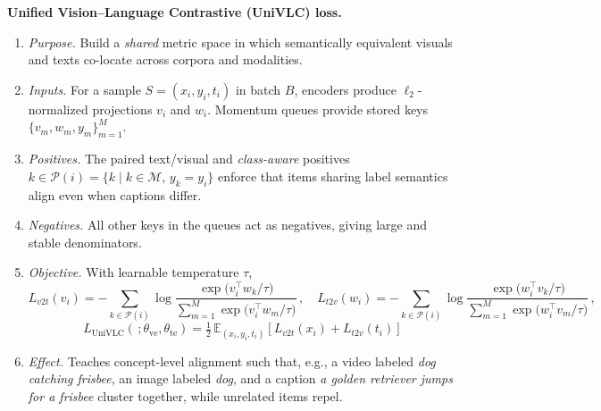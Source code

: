 \begin{enrichment}
\begin{enrichment}
        \noindent\textbf{Unified Vision–Language Contrastive (UniVLC) loss.}
        \begin{enumerate}
            \item \textit{Purpose.} Build a \emph{shared} metric space in which semantically equivalent visuals and texts co-locate across corpora and modalities.
            \item \textit{Inputs.} For a sample \(S=(x_i,y_i,t_i)\) in batch \(B\), encoders produce \(\ell_2\)-normalized projections \(v_i\) and \(w_i\). Momentum queues provide stored keys \(\{v_m,w_m,y_m\}_{m=1}^M\).
            \item \textit{Positives.} The paired text/visual and \emph{class-aware} positives \(k\in\mathcal{P}(i)=\{k\mid k\in\mathcal{M},\,y_k=y_i\}\) enforce that items sharing label semantics align even when captions differ.
            \item \textit{Negatives.} All other keys in the queues act as negatives, giving large and stable denominators.
            \item \textit{Objective.} With learnable temperature \(\tau\),
            \[
            L_{v2t}(v_i)=-\sum_{k\in\mathcal{P}(i)} \log \frac{\exp\big(v_i^\top w_k/\tau\big)}{\sum_{m=1}^{M}\exp\big(v_i^\top w_m/\tau\big)}\,,\quad
            L_{t2v}(w_i)=-\sum_{k\in\mathcal{P}(i)} \log \frac{\exp\big(w_i^\top v_k/\tau\big)}{\sum_{m=1}^{M}\exp\big(w_i^\top v_m/\tau\big)}\,,
            \tag{1}
            \]
            \[
            L_{\mathrm{UniVLC}}(\,;\theta_{\mathrm{ve}},\theta_{\mathrm{te}})=\tfrac{1}{2}\,\mathbb{E}_{(x_i,y_i,t_i)}\!\left[L_{v2t}(x_i)+L_{t2v}(t_i)\right]
            \tag{2}
            \]
            \item \textit{Effect.} Teaches concept-level alignment such that, e.g., a video labeled \textit{dog catching frisbee}, an image labeled \textit{dog}, and a caption \textit{a golden retriever jumps for a frisbee} cluster together, while unrelated items repel.
        \end{enumerate}
        

\end{enrichment}
\end{enrichment}

